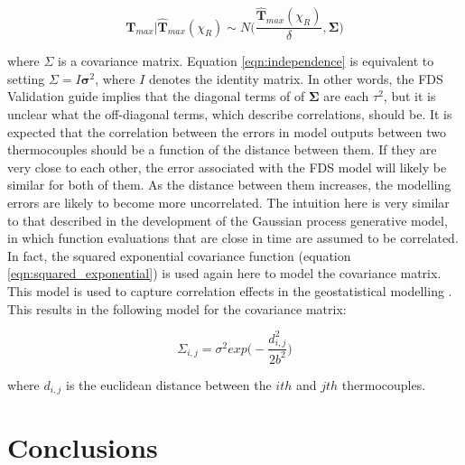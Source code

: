 \documentclass{article}
\begin{document}
\begin{equation}
  \label{eqn:mv_likelihood}
    \boldsymbol{T}_{max} \bigg| \boldsymbol{\hat{T}}_{max}(\chi_R) \sim N\Bigg( \frac{\hat{\boldsymbol{T}}_{max}(\chi_R)}{\delta}, \boldsymbol\Sigma \Bigg)
\end{equation}

\noindent where $\Sigma$ is a covariance matrix. Equation \ref{eqn:independence} is equivalent to setting $\Sigma = I\boldsymbol{\sigma}^2$, where $I$ denotes the identity matrix. In other words, the FDS Validation guide implies that the diagonal terms of of $\boldsymbol\Sigma$ are each $\tau^2$, but it is unclear what the off-diagonal terms, which describe correlations, should be. It is expected that the correlation between the errors in model outputs between two thermocouples should be a function of the distance between them. If they are very close to each other, the error associated with the FDS model will likely be similar for both of them. As the distance between them increases, the modelling errors are likely to become more uncorrelated. The intuition here is very similar to that described in the development of the Gaussian process generative model, in which function evaluations that are close in time are assumed to be correlated. In fact, the squared exponential covariance function (equation \ref{eqn:squared_exponential}) is used again here to model the covariance matrix. This model is used to capture correlation effects in the geostatistical modelling \cite{f2007methods}. This results in the following model for the covariance matrix:

 \begin{equation}
  \label{eqn:squared_exponential_spatial}
    \Sigma_{i,j}= \sigma^2exp\bigg(-\frac{d_{i,j}^2}{2b^2}\bigg)
\end{equation}

\noindent where $d_{i,j}$ is the euclidean distance between the $ith$ and $jth$ thermocouples. 


\section{Conclusions}


\clearpage


\end{document}
